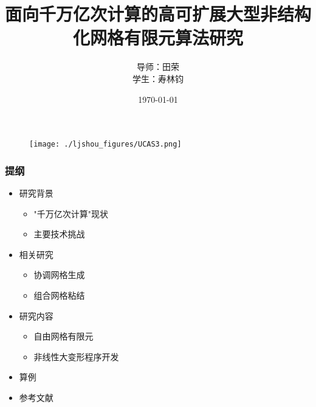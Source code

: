 \documentclass[mathserif]{beamer}
\begin{document}
\begin{CJK}{UTF8}{gkai}

\title{面向千万亿次计算的高可扩展大型非结构化网格有限元算法研究}
\author{导师：田荣 \\ 学生：寿林钧} 
\date{\today} 

   
\begin{frame}
\titlepage
\begin{figure}
	\texttt{[image: ./ljshou\_figures/UCAS3.png]}
\end{figure}
\end{frame}

\begin{frame}
   \frametitle{提纲}
   \tableofcontents
        
        \begin{itemize}
            \item 研究背景
                \begin{itemize}
                \item "千万亿次计算"现状
                \item 主要技术挑战
                \end{itemize}
            \item 相关研究
                \begin{itemize}
                \item 协调网格生成
                \item 组合网格粘结
                \end{itemize}
            \item 研究内容
    		  \begin{itemize}
    		  	\item 自由网格有限元
            \item 非线性大变形程序开发
    		  \end{itemize}
            \item 算例
            \item 参考文献
        \end{itemize}
\end{frame}



\end{CJK}
\end{document}
